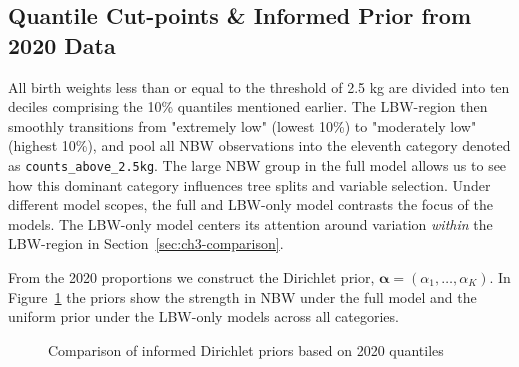 \subsection{Quantile Cut-points \& Informed Prior from 2020 Data}
\label{sec:ch3-cutpoints}
All birth weights less than or equal to the threshold of 2.5 kg are divided into ten deciles comprising the 10\% quantiles mentioned earlier. The LBW-region then smoothly transitions from "extremely low" (lowest 10\%) to "moderately low" (highest 10\%), and pool all NBW observations into the eleventh category denoted as \texttt{counts\_above\_2.5kg}. The large NBW group in the full model allows us to see how this dominant category influences tree splits and variable selection. Under different model scopes, the full and LBW-only model contrasts the focus of the models. The LBW-only model centers its attention around variation \emph{within} the LBW-region in Section~\ref{sec:ch3-comparison}.

From the 2020 proportions we construct the Dirichlet prior,  \(\boldsymbol{\alpha} = (\alpha_1, \dots, \alpha_K)\). In Figure~\ref{fig:alphavec} the priors show the strength in NBW under the full model and the uniform prior under the LBW-only models across all categories. 

\begin{figure}[H]
    \centering
    \qquad
    \caption{Comparison of informed Dirichlet priors based on 2020 quantiles}
    \label{fig:alphavec}
\end{figure}


